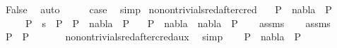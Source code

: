 \begin{isabellebody}
\ False\ \isamarkupfalse%
\ auto\isanewline
\ \ \isamarkupfalse%
\ \isamarkupfalse%
\ {\isacharquery}{\kern0pt}case\ \isamarkupfalse%
\ simp\isanewline
{}\isamarkupfalse%
%
\endisatagproof
{\isafoldproof}%
%
\isadelimproof
\isanewline
%
\endisadelimproof
\isanewline
{}\isamarkupfalse%
\ no{\isacharunderscore}{\kern0pt}nontrivial{\isacharunderscore}{\kern0pt}sred{\isacharunderscore}{\kern0pt}after{\isacharunderscore}{\kern0pt}cred{\isacharcolon}{\kern0pt}\isanewline
\ \ \ {\isachardoublequoteopen}P{}\ {\isasymturnstile}\ nabla{}\ {\isasymrightarrow}\ P{}{\isachardoublequoteclose}\isanewline
\ \ \ \ \ {\isachardoublequoteopen}P{}\ {\isasymturnstile}\ s\ {\isasymleadsto}\isactrlsup {\isacharasterisk}{\kern0pt}\ P{\isacharprime}{\kern0pt}{\isachardoublequoteclose}\ \ {\isachardoublequoteopen}P{\isacharprime}{\kern0pt}\ {\isasymturnstile}\ nabla{}\ {\isasymrightarrow}\isactrlsup {\isacharasterisk}{\kern0pt}\ P{}{\isachardoublequoteclose}\isanewline
\ \ \ {\isachardoublequoteopen}P{}\ {\isasymturnstile}\ {\isacharparenleft}{\kern0pt}nabla{}\ {\isasymunion}\ nabla{}{\isacharparenright}{\kern0pt}\ {\isasymrightarrow}\isactrlsup {\isacharasterisk}{\kern0pt}\ P{}{\isachardoublequoteclose}\isanewline
%
\isadelimproof
\ \ %
\endisadelimproof
%
\isatagproof
{}\isamarkupfalse%
\ assms\isanewline
{}\isamarkupfalse%
{\isacharminus}{\kern0pt}\isanewline
\ \ \isamarkupfalse%
\ assms{\isacharparenleft}{\kern0pt}{}{\isacharcomma}{\kern0pt}{}{\isacharparenright}{\kern0pt}\ \isamarkupfalse%
\ {\isachardoublequoteopen}P{}\ {\isacharequal}{\kern0pt}\ P{\isacharprime}{\kern0pt}{\isachardoublequoteclose}\ \isanewline
\ \ \ \ \isamarkupfalse%
\ no{\isacharunderscore}{\kern0pt}nontrivial{\isacharunderscore}{\kern0pt}sred{\isacharunderscore}{\kern0pt}after{\isacharunderscore}{\kern0pt}cred{\isacharunderscore}{\kern0pt}aux\ \isamarkupfalse%
\ simp\isanewline
\ \ \isamarkupfalse%
\ {\isachardoublequoteopen}P{}\ {\isasymturnstile}\ nabla{}\ {\isasymrightarrow}\isactrlsup {\isacharasterisk}{\kern0pt}\ P{}{\isachardoublequoteclose}\ \isanewline
\ \ \ \ \isamarkupfalse%

\end{isabellebody}
